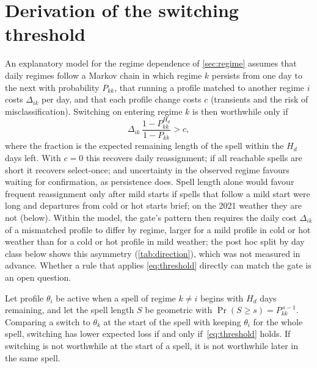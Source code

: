 \section{Derivation of the switching threshold}\label{app:theory}
An explanatory model for the regime dependence of \cref{sec:regime} assumes that daily regimes follow a Markov chain in which regime $k$
persists from one day to the next with probability $P_{kk}$, that running a profile matched to another regime $i$ costs
$\Delta_{ik}$ per day, and that each profile change costs $c$ (transients and the risk of misclassification). Switching on
entering regime $k$ is then worthwhile only if
\begin{equation}
  \Delta_{ik}\,\frac{1-P_{kk}^{H_d}}{1-P_{kk}} > c ,
  \label{eq:threshold}
\end{equation}
where the fraction is the expected remaining length of the spell within the $H_d$ days left. With $c=0$ this recovers
daily reassignment; if all reachable spells are short it recovers select-once; and uncertainty in the observed regime
favours waiting for confirmation, as persistence does. Spell length alone would favour frequent reassignment only after mild
starts if spells that follow a mild start were long and departures from cold or hot starts brief; on the 2021 weather they
are not (below). Within the model, the gate's pattern then requires the daily cost $\Delta_{ik}$ of a mismatched profile to
differ by regime, larger for a mild profile in cold or hot weather than for a cold or hot profile in mild weather; the post hoc split by day class below shows this asymmetry
(\cref{tab:direction}), which was not measured in advance. Whether a rule that applies \eqref{eq:threshold} directly can match the gate is an open question.

\begin{proposition}\label{prop:threshold}
Let profile $\theta_i$ be active when a spell of regime $k \ne i$ begins with $H_d$ days remaining, and let the spell
length $S$ be geometric with $\Pr(S \ge s) = P_{kk}^{\,s-1}$. Comparing a switch to $\theta_k$ at the start of the spell
with keeping $\theta_i$ for the whole spell, switching has lower expected loss if and only if~\eqref{eq:threshold}
holds. If switching is not worthwhile at the start of a spell, it is not worthwhile later in the same spell.
\end{proposition}

